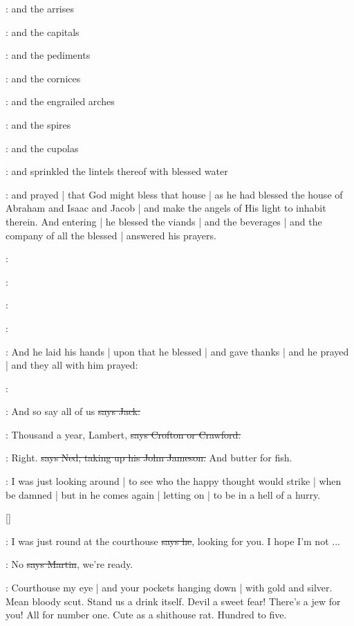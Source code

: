 :
and the arrises

:
and the capitals

:
and the pediments

:
and the cornices

:
and the engrailed arches

:
and the spires

:
and the cupolas

:
and sprinkled the lintels thereof with blessed water

:
and prayed |
that God might bless that house |
as he had blessed the house of Abraham and Isaac and Jacob |
and make the angels of His light to inhabit therein.
And entering |
he blessed the viands |
and the beverages |
and the company of all the blessed |
answered his prayers.

:

:

:

:

:
And he laid his hands |
upon that he blessed |
and gave thanks |
and he prayed |
and they all with him prayed:

\All:

\power:
And so say all of us
\sout{says Jack.}

\crofton:
Thousand a year,
Lambert,
\sout{says Crofton or Crawford.}

\lambert:
Right.
\sout{says Ned,
taking up his John Jameson.}
And butter for fish.

\Nq:
I was just looking around |
to see who the happy thought would strike |
when be damned |
but in he comes again |
letting on |
to be in a hell of a hurry.

[]

\Bloom:
I was just round at the courthouse
\sout{says he},
looking for you.
I hope I'm not ...

\cunningham:
No
\sout{says Martin},
we're ready.

\Nq:
Courthouse my eye |
and your pockets hanging down |
with gold and silver.
Mean bloody scut.
Stand us a drink itself.
Devil a sweet fear!
There's a jew for you!
All for number one.
Cute as a shithouse rat.
Hundred to five.

